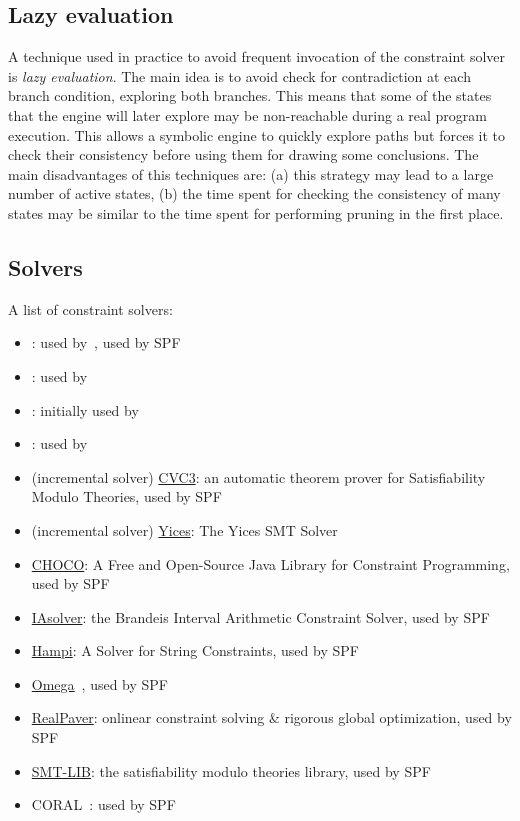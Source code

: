 \subsection{Lazy evaluation}
A technique used in practice to avoid frequent invocation of the constraint solver is {\em lazy evaluation}. The main idea is to avoid check for contradiction at each branch condition, exploring both branches. This means that some of the states that the engine will later explore may be non-reachable during a real program execution. This allows a symbolic engine to quickly explore paths but forces it to check their consistency before using them for drawing some conclusions. The main disadvantages of this techniques are: (a) this strategy may lead to a large number of active states, (b) the time spent for checking the consistency of many states may be similar to the time spent for performing pruning in the first place.

\subsection{Solvers}
A list of constraint solvers:
\begin{itemize}
  \item \cite{STP-TR07}: used by~\cite{EXE-CCS06,KLEE-OSDI08,MineSweeper-BOTNET08}, used by SPF
  \item \cite{Z3-TACS08}: used by~\cite{FIRMALICE-NDSS15,MAYHEM-SP12}
  \item \cite{DISSOLVER-TR03}: initially used by \cite{SAGE-NDSS08}
  \item \cite{PPL-SCP08}: used by \cite{AEG-NDSS11}
  \item (incremental solver) \href{http://www.cs.nyu.edu/acsys/cvc3/}{CVC3}: an automatic theorem prover for Satisfiability Modulo Theories, used by SPF
  \item (incremental solver) \href{http://yices.csl.sri.com/}{Yices}: The Yices SMT Solver~\cite{YICES-CAV06}
  \item \href{http://choco-solver.org/}{CHOCO}: A Free and Open-Source Java Library for Constraint Programming, used by SPF
  \item \href{http://www.cs.brandeis.edu/~tim/Applets/IAsolver.html}{IAsolver}: the Brandeis Interval Arithmetic Constraint Solver, used by SPF
  \item \href{https://people.csail.mit.edu/akiezun/hampi/}{Hampi}: A Solver for String Constraints, used by SPF
  \item \href{https://www.cs.umd.edu/projects/omega/}{Omega}~\cite{OMEGA-SC91}, used by SPF
  \item \href{http://pagesperso.lina.univ-nantes.fr/~granvilliers-l/realpaver/}{RealPaver}: onlinear constraint solving \& rigorous global optimization, used by SPF
  \item \href{http://smtlib.cs.uiowa.edu/}{SMT-LIB}: the satisfiability modulo theories library, used by SPF
  \item CORAL~\cite{CORAL-NFM11}: used by SPF
\end{itemize}

